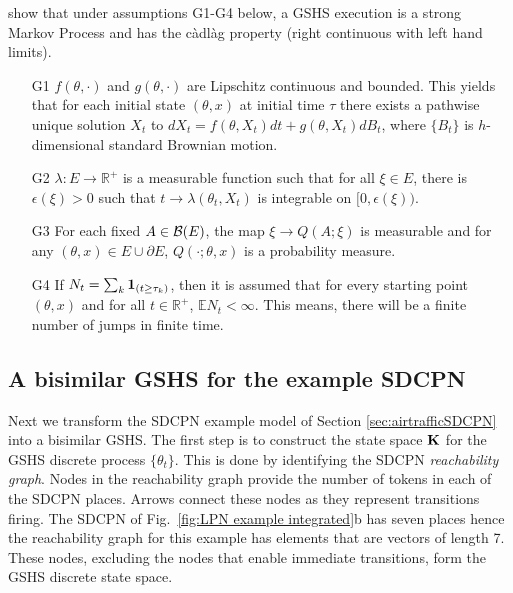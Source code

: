 \documentclass[copyright,creativecommons]{eptcs}
\begin{document}
\cite{BujorianuLygeros2006} show that under assumptions G1-G4 below,
a GSHS execution is a strong Markov Process and has the c{\`a}dl{\`a}g property
(right continuous with left hand limits).
\begin{itemize}
\item[G1] $f(\theta, \cdot)$ and $g(\theta, \cdot)$ are Lipschitz continuous and bounded.
      This yields that for each initial state $(\theta,x)$ at initial time $\tau$
      there exists a pathwise unique solution $X_t$ to
      $dX_t = f(\theta,X_t)dt + g(\theta, X_t)dB_t$, where
      $\{B_t\}$ is $h$-dimensional standard Brownian motion.

\item[G2] $\lambda: E \to \mathbb{R}^{+}$
      is a measurable function such that for all $\xi \in E$, there is $\epsilon(\xi) > 0$ such that
      $t \to \lambda(\theta_t,X_t)$ is integrable on $[0,\epsilon(\xi))$.

\item[G3] For each fixed $A \in {\cal B}(E)$, the map $\xi \to
Q(A;\xi)$ is measurable and
      for any $(\theta,x) \in E \cup \partial E$, $Q(\cdot; \theta,x)$ is a probability measure.

\item[G4] If $N_t = \sum_k {\bf 1}_{(t \geq \tau_k)}$, then it is assumed that for every starting point $(\theta,x)$ and
      for all $t \in \mathbb{R}^{+}$, $\mathbb{E}N_t < \infty$. This means, there will be a finite
      number of jumps in finite time.
\end{itemize}

\subsection{A bisimilar GSHS for the example SDCPN}\label{sec:sdcpnexample}
Next we transform the SDCPN example model of Section \ref{sec:airtrafficSDCPN}
into a bisimilar GSHS. The first step is to construct the state space
${\bf K}$ for the GSHS discrete process $\{\theta_t\}$. This is
done by identifying the  SDCPN {\em reachability graph}. Nodes in
the reachability graph provide the number of tokens in each of the
SDCPN places. Arrows connect these nodes as they represent
transitions firing. The SDCPN of Fig.\ \ref{fig:LPN example
integrated}b has seven places hence the reachability graph for this
example has elements that are vectors of length 7. These nodes,
excluding the nodes that enable immediate transitions, form the
GSHS discrete state space.
\end{document}
